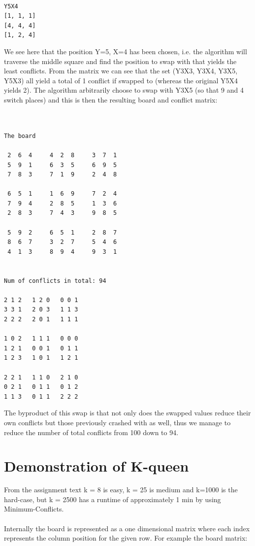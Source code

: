\documentclass[12pt, a4paper]{article}
\begin{document}
\begin{verbatim}

Y5X4
[1, 1, 1]
[4, 4, 4]
[1, 2, 4]

\end{verbatim}
\noindent
We see here that the position Y=5, X=4 has been chosen, i.e. the algorithm will traverse the middle square and find the position to swap with that yields the least conflicts.
From the matrix we can see that the set (Y3X3, Y3X4, Y3X5, Y5X3) all yield a total of 1 conflict if swapped to (whereas the original Y5X4 yields 2). The algorithm arbitrarily choose to swap with Y3X5 (so that 9 and 4 switch places) and this is then the resulting board and conflict matrix:

\begin{verbatim}


The board

 2  6  4     4  2  8     3  7  1 
 5  9  1     6  3  5     6  9  5 
 7  8  3     7  1  9     2  4  8 

 6  5  1     1  6  9     7  2  4 
 7  9  4     2  8  5     1  3  6 
 2  8  3     7  4  3     9  8  5 

 5  9  2     6  5  1     2  8  7 
 8  6  7     3  2  7     5  4  6 
 4  1  3     8  9  4     9  3  1 


Num of conflicts in total: 94

2 1 2 	1 2 0 	0 0 1 
3 3 1 	2 0 3 	1 1 3 
2 2 2 	2 0 1 	1 1 1 

1 0 2 	1 1 1 	0 0 0 
1 2 1 	0 0 1 	0 1 1 
1 2 3 	1 0 1 	1 2 1 

2 2 1 	1 1 0 	2 1 0 
0 2 1 	0 1 1 	0 1 2 
1 1 3 	0 1 1 	2 2 2 

\end{verbatim}

\noindent 
The byproduct of this swap is that not only does the swapped values reduce their own conflicts but those previously crashed with as well, thus we manage to reduce the number of total conflicts from 100 down to 94.

\section{Demonstration of K-queen}
From the assignment text k = 8 is easy, k = 25 is medium and k=1000 is the hard-case, but k = 2500 has a runtime of approximately 1 min by using Minimum-Conflicts.
\\\\
Internally the board is represented as a one dimensional matrix where each index represents the column position for the given row. For example the board matrix:
\end{document}
